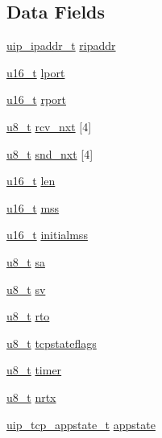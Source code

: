\subsection*{Data Fields}
\begin{DoxyCompactItemize}
\item 
\hyperlink{group__uip_ga1ef35301f43a5bbb9f89f07b5a36b9a0}{uip\_\-ipaddr\_\-t} \hyperlink{structuip__conn_a79510aa86d3fa0a0fc6cfc49b1da7279}{ripaddr}
\item 
\hyperlink{group__uipfw_ga77570ac4fcab86864fa1916e55676da2}{u16\_\-t} \hyperlink{structuip__conn_a0cd09beee671e7e9efb0b4aced10249e}{lport}
\item 
\hyperlink{group__uipfw_ga77570ac4fcab86864fa1916e55676da2}{u16\_\-t} \hyperlink{structuip__conn_a1df6aa054ef2fa634ac4c6f418228285}{rport}
\item 
\hyperlink{group__uipfw_ga4caecabca98b43919dd11be1c0d4cd8e}{u8\_\-t} \hyperlink{structuip__conn_a70297b3e6d4eaae7bd828cb50bd1efe3}{rcv\_\-nxt} \mbox{[}4\mbox{]}
\item 
\hyperlink{group__uipfw_ga4caecabca98b43919dd11be1c0d4cd8e}{u8\_\-t} \hyperlink{structuip__conn_a8f6b08a5ba2a8d75ca7279e2056aa8c6}{snd\_\-nxt} \mbox{[}4\mbox{]}
\item 
\hyperlink{group__uipfw_ga77570ac4fcab86864fa1916e55676da2}{u16\_\-t} \hyperlink{structuip__conn_a0ef3ae2764714bf90620075c374c262e}{len}
\item 
\hyperlink{group__uipfw_ga77570ac4fcab86864fa1916e55676da2}{u16\_\-t} \hyperlink{structuip__conn_a3347ef1b6e8581402445d1a0280c7a14}{mss}
\item 
\hyperlink{group__uipfw_ga77570ac4fcab86864fa1916e55676da2}{u16\_\-t} \hyperlink{structuip__conn_adb7a3fadb68df5fdd37e8b91a2c751ea}{initialmss}
\item 
\hyperlink{group__uipfw_ga4caecabca98b43919dd11be1c0d4cd8e}{u8\_\-t} \hyperlink{structuip__conn_aef661afb3aa82f0437d2ed8d3c20be76}{sa}
\item 
\hyperlink{group__uipfw_ga4caecabca98b43919dd11be1c0d4cd8e}{u8\_\-t} \hyperlink{structuip__conn_aeb9fcbd3c9b0a795dcd63f33c323d65c}{sv}
\item 
\hyperlink{group__uipfw_ga4caecabca98b43919dd11be1c0d4cd8e}{u8\_\-t} \hyperlink{structuip__conn_ae3aa9cc25e45b663e6aabc54c013019e}{rto}
\item 
\hyperlink{group__uipfw_ga4caecabca98b43919dd11be1c0d4cd8e}{u8\_\-t} \hyperlink{structuip__conn_aa5f58074435cdc180f17de69651beebd}{tcpstateflags}
\item 
\hyperlink{group__uipfw_ga4caecabca98b43919dd11be1c0d4cd8e}{u8\_\-t} \hyperlink{structuip__conn_a2d9732cf5752d30bd11cb25dc7d0c8d3}{timer}
\item 
\hyperlink{group__uipfw_ga4caecabca98b43919dd11be1c0d4cd8e}{u8\_\-t} \hyperlink{structuip__conn_a4289c59840b128f2f6526e9da2711d47}{nrtx}
\item 
\hyperlink{unionuip__tcp__appstate__t}{uip\_\-tcp\_\-appstate\_\-t} \hyperlink{structuip__conn_a97f9e1fda815bfb8b1f4577c355ade20}{appstate}
\end{DoxyCompactItemize}


